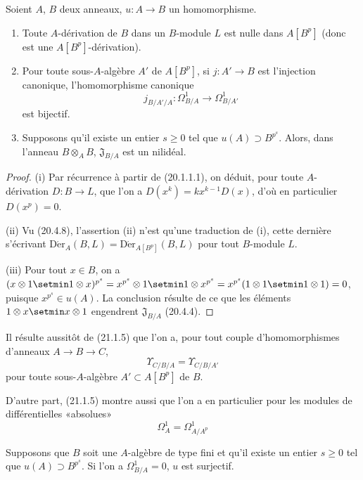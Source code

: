 \begin{proposition}[21.1.5]
\label{0.21.1.5-fr}
Soient $A$, $B$ deux anneaux, $u:A\to B$ un homomorphisme.
\begin{enumerate}
  \item[\textup{(i)}] Toute $A$-dérivation de $B$ dans un $B$-module $L$ est nulle
  dans $A[B^p]$ (donc est une $A[B^p]$-dérivation).
  \item[\textup{(ii)}] Pour toute sous-$A$-algèbre $A'$ de $A[B^p]$, si
  $j:A'\to B$ est l'injection canonique, l'homomorphisme canonique
  \[
  j_{B/A'/A}:\Omega^1_{B/A}\longrightarrow\Omega^1_{B/A'}
  \]
  est bijectif.
  \item[\textup{(iii)}] Supposons qu'il existe un entier $s\geq0$ tel que
  $u(A)\supset B^{p^s}$. Alors, dans l'anneau $B\otimes_A B$,
  $\mathfrak J_{B/A}$ est un nilidéal.
\end{enumerate}
\end{proposition}

\begin{proof}
(i) Par récurrence à partir de (20.1.1.1), on déduit, pour toute
$A$-dérivation $D:B\to L$, que l'on a $D(x^k)=kx^{k-1}D(x)$, d'où en particulier
$D(x^p)=0$.

(ii) Vu (20.4.8), l'assertion (ii) n'est qu'une traduction de (i), cette
dernière s'écrivant $\operatorname{D\acute{e}r}_A(B,L)=\operatorname{D\acute{e}r}_{A[B^p]}(B,L)$
pour tout $B$-module $L$.

(iii) Pour tout $x\in B$, on a
$(x\otimes1\setmin1\otimes x)^{p^s}=x^{p^s}\otimes1\setmin1\otimes x^{p^s}=x^{p^s}(1\otimes1\setmin1\otimes1)=0$,
puisque $x^{p^s}\in u(A)$. La conclusion résulte de ce que les éléments
$1\otimes x\setmin x\otimes1$ engendrent $\mathfrak J_{B/A}$ (20.4.4).
\end{proof}

Il résulte aussitôt de (21.1.5) que l'on a, pour tout couple d'homomorphismes
d'anneaux $A\to B\to C$,
\begin{equation}
\tag{21.1.5.1}
\label{0.21.1.5.1-fr}
\Upsilon_{C/B/A}=\Upsilon_{C/B/A'}
\end{equation}
pour toute sous-$A$-algèbre $A'\subset A[B^p]$ de $B$.

D'autre part, (21.1.5) montre aussi que l'on a en particulier pour les modules de
différentielles «absolues»
\begin{equation}
\tag{21.1.5.2}
\label{0.21.1.5.2-fr}
\Omega^1_A=\Omega^1_{A/A^p}
\end{equation}

\begin{corollary}[21.1.6]
\label{0.21.1.6-fr}
Supposons que $B$ soit une $A$-algèbre de type fini et qu'il existe un
entier $s\geq0$ tel que $u(A)\supset B^{p^s}$. Si l'on a $\Omega^1_{B/A}=0$,
$u$ est surjectif.
\end{corollary}

